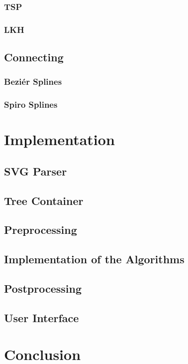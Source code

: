 \documentclass[10pt,a4paper]{article}
\begin{document}
\subsubsection{TSP}
\subsubsection{LKH}

\subsection{Connecting}
\subsubsection{Beziér Splines}
\subsubsection{Spiro Splines}

\section{Implementation}
\subsection{SVG Parser}
\subsection{Tree Container}
\subsection{Preprocessing}
\subsection{Implementation of the Algorithms}
\subsection{Postprocessing}
\subsection{User Interface}

\section{Conclusion}
\end{document}
